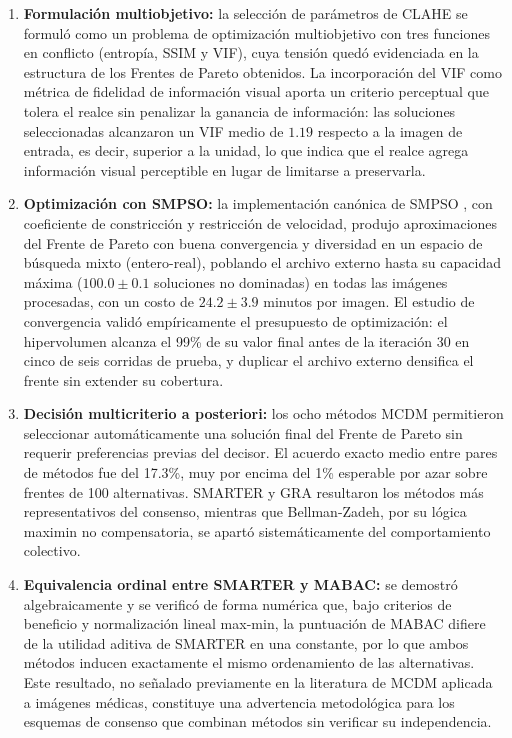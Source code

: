 \begin{enumerate}
    \item \textbf{Formulación multiobjetivo:} la selección de parámetros de CLAHE se formuló como un problema de optimización multiobjetivo con tres funciones en conflicto (entropía, SSIM y VIF), cuya tensión quedó evidenciada en la estructura de los Frentes de Pareto obtenidos. La incorporación del VIF como métrica de fidelidad de información visual aporta un criterio perceptual que tolera el realce sin penalizar la ganancia de información: las soluciones seleccionadas alcanzaron un VIF medio de $1.19$ respecto a la imagen de entrada, es decir, superior a la unidad, lo que indica que el realce agrega información visual perceptible en lugar de limitarse a preservarla.

    \item \textbf{Optimización con SMPSO:} la implementación canónica de SMPSO \citep{Nebro2009}, con coeficiente de constricción y restricción de velocidad, produjo aproximaciones del Frente de Pareto con buena convergencia y diversidad en un espacio de búsqueda mixto (entero-real), poblando el archivo externo hasta su capacidad máxima ($100.0 \pm 0.1$ soluciones no dominadas) en todas las imágenes procesadas, con un costo de $24.2 \pm 3.9$ minutos por imagen. El estudio de convergencia validó empíricamente el presupuesto de optimización: el hipervolumen alcanza el 99\% de su valor final antes de la iteración 30 en cinco de seis corridas de prueba, y duplicar el archivo externo densifica el frente sin extender su cobertura.

    \item \textbf{Decisión multicriterio a posteriori:} los ocho métodos MCDM permitieron seleccionar automáticamente una solución final del Frente de Pareto sin requerir preferencias previas del decisor. El acuerdo exacto medio entre pares de métodos fue del 17.3\%, muy por encima del 1\% esperable por azar sobre frentes de 100 alternativas. SMARTER y GRA resultaron los métodos más representativos del consenso, mientras que Bellman-Zadeh, por su lógica maximin no compensatoria, se apartó sistemáticamente del comportamiento colectivo.

    \item \textbf{Equivalencia ordinal entre SMARTER y MABAC:} se demostró algebraicamente y se verificó de forma numérica que, bajo criterios de beneficio y normalización lineal max-min, la puntuación de MABAC difiere de la utilidad aditiva de SMARTER en una constante, por lo que ambos métodos inducen exactamente el mismo ordenamiento de las alternativas. Este resultado, no señalado previamente en la literatura de MCDM aplicada a imágenes médicas, constituye una advertencia metodológica para los esquemas de consenso que combinan métodos sin verificar su independencia.


\end{enumerate}
